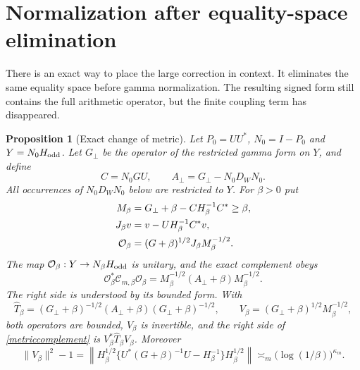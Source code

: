 \documentclass[11pt]{article}
\newtheorem{proposition}[theorem]{Proposition}
\theoremstyle{remark}
\begin{document}
\section{Normalization after equality-space elimination}

There is an exact way to place the large correction in context.
It eliminates the same equality space before gamma normalization.
The resulting signed form still contains the full arithmetic
operator, but the finite coupling term has disappeared.

\begin{proposition}[Exact change of metric]\label{metric}
Let \(P_0=UU^*\), \(N_0=I-P_0\) and \(Y=N_0H_{\rm odd}\).
Let \(G_\perp\) be the operator of the restricted gamma form on \(Y\),
and define
\[
 C=N_0GU,\qquad
 A_\perp=G_\perp-N_0D_WN_0.
\]
All occurrences of \(N_0D_WN_0\) below are restricted to \(Y\).
For \(\beta>0\) put
\begin{align}
 M_\beta&=G_\perp+\beta-CH_\beta^{-1}C^*\ge\beta,\notag\\
 J_\beta v&=v-UH_\beta^{-1}C^*v,\notag\\
 \mathcal O_\beta&=(G+\beta)^{1/2}J_\beta M_\beta^{-1/2}.
                                                        \label{shortmetric}
\end{align}
The map \(\mathcal O_\beta:Y\to N_\beta H_{\rm odd}\) is unitary,
and the exact complement obeys
\begin{equation}\label{metriccomplement}
 \mathcal O_\beta^*\mathcal C_{m,\beta}\mathcal O_\beta
       =M_\beta^{-1/2}(A_\perp+\beta)M_\beta^{-1/2}.
\end{equation}
The right side is understood by its bounded form.
With
\[
 \widehat T_\beta=(G_\perp+\beta)^{-1/2}
                    (A_\perp+\beta)(G_\perp+\beta)^{-1/2},
 \qquad
 V_\beta=(G_\perp+\beta)^{1/2}M_\beta^{-1/2},
\]
both operators are bounded, \(V_\beta\) is invertible, and the
right side of \eqref{metriccomplement} is
\(V_\beta^*\widehat T_\beta V_\beta\). Moreover
\begin{equation}\label{metricgrowth}
 \|V_\beta\|^2-1
 =\left\|H_\beta^{1/2}
       \{U^*(G+\beta)^{-1}U-H_\beta^{-1}\}H_\beta^{1/2}\right\|
 \asymp_m\bigl(\log(1/\beta)\bigr)^{\kappa_m}.
\end{equation}
\end{proposition}
\end{document}
